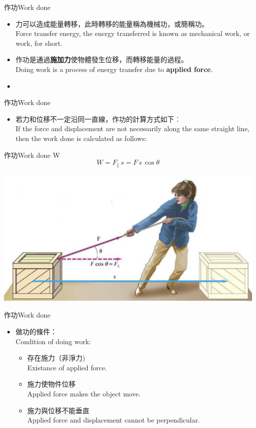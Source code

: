 \documentclass[beamer=true]{standalone}
\begin{document}
\begin{frame}{作功Work done}
    \begin{itemize}
        \item 力可以造成能量轉移，此時轉移的能量稱為機械功，或簡稱功。 \\Force transfer energy, the energy transferred is known as mechanical work, or work, for short.
        \item 作功是通過\textbf{施加力}使物體發生位移，而轉移能量的過程。\\Doing work is a process of energy transfer due to \textbf{applied force}.
        \item {}
    \end{itemize}
\end{frame}

\begin{frame}{作功Work done}
    \begin{itemize}
        \item 若力和位移不一定沿同一直線，作功的計算方式如下︰\\If the force and displacement are not necessarily along the same straight line, then the work done is calculated as follows:
    \end{itemize}
    \begin{alertblock}
        {作功Work done W}
        \begin{equation}
            W=F_\parallel \, s= F\, s\, \cos \theta
        \end{equation}
    \end{alertblock}
    {\par\centering
    \includegraphics[width=.65\textwidth]{assets/af6c9fc3.png}
    \par}
\end{frame}
\begin{frame}{作功Work done}
    \begin{itemize}
        \item 做功的條件：\\Condition of doing work:
              \begin{itemize}
                  \item 存在施力（非淨力)\\Existance of applied force.
                  \item 施力使物件位移\\Applied force makes the object move.
                  \item 施力與位移不能垂直\\Applied force and displacement cannot be perpendicular.
              \end{itemize}
    \end{itemize}

\end{frame}
\end{document}
